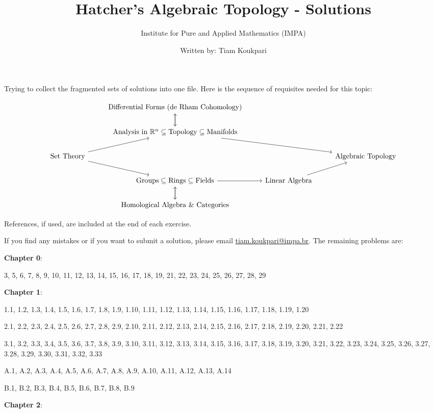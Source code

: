 \documentclass{article}
\title{Hatcher's Algebraic Topology - Solutions}
\author{Institute for Pure and Applied Mathematics (IMPA)}
\date{Written by: Tiam Koukpari}
\newcommand{\R}{\mathbb{R}}
\begin{document}
\maketitle

Trying to collect the fragmented sets of solutions into one file. Here is the sequence of requisites needed for this topic:
\bigskip

\[\begin{tikzcd}
& \textnormal{Differential Forms (de Rham Cohomology)} \arrow[d] & \\
& \textnormal{Analysis in } \R^{n} \subseteq \textnormal{Topology} \subseteq \textnormal{Manifolds} \arrow[rrd] \arrow[u] & \\
\textnormal{Set Theory} \arrow[ru] \arrow[rd] & & & \textnormal{Algebraic Topology} \\
& \textnormal{Groups} \subseteq \textnormal{Rings} \subseteq \textnormal{Fields} \arrow[r]\arrow[d] & \textnormal{Linear Algebra} \arrow[ru] & \\
& \textnormal{Homological Algebra \& Categories} \arrow[u]
\end{tikzcd}\]
\bigskip
\bigskip

References, if used, are included at the end of each exercise.
\medskip

If you find any mistakes or if you want to submit a solution, please email \href{mailto:tiam.koukpari@impa.br}{tiam.koukpari@impa.br}. The remaining problems are:
\medskip

\textbf{Chapter 0}:
\medskip

3, 5, 6, 7, 8, 9, 10, 11, 12, 13, 14, 15, 16, 17, 18, 19, 21, 22, 23, 24, 25, 26, 27, 28, 29
\medskip

\textbf{Chapter 1}:
\medskip

1.1, 1.2, 1.3, 1.4, 1.5, 1.6, 1.7, 1.8, 1.9, 1.10, 1.11, 1.12, 1.13, 1.14, 1.15, 1.16, 1.17, 1.18, 1.19, 1.20

2.1, 2.2, 2.3, 2.4, 2.5, 2.6, 2.7, 2.8, 2.9, 2.10, 2.11, 2.12, 2.13, 2.14, 2.15, 2.16, 2.17, 2.18, 2.19, 2.20, 2.21, 2.22

3.1, 3.2, 3.3, 3.4, 3.5, 3.6, 3.7, 3.8, 3.9, 3.10, 3.11, 3.12, 3.13, 3.14, 3.15, 3.16, 3.17, 3.18, 3.19, 3.20, 3.21, 3.22, 3.23, 3.24, 3.25, 3.26, 3.27, 3.28, 3.29, 3.30, 3.31, 3.32, 3.33

A.1, A.2, A.3, A.4, A.5, A.6, A.7, A.8, A.9, A.10, A.11, A.12, A.13, A.14

B.1, B.2, B.3, B.4, B.5, B.6, B.7, B.8, B.9
\medskip

\textbf{Chapter 2}:
\medskip
\end{document}
